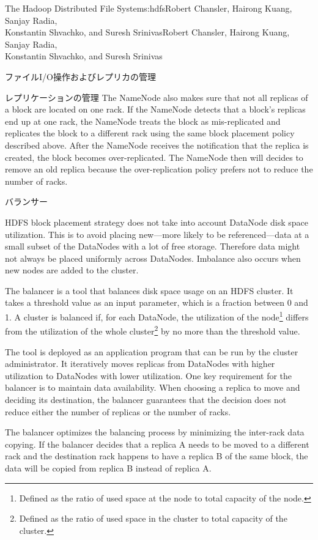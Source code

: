 \begin{aosachaptertoc}{The Hadoop Distributed File System}{s:hdfs}{Robert Chansler, Hairong Kuang, Sanjay Radia, \\ Konstantin Shvachko, and Suresh Srinivas}{Robert Chansler, Hairong Kuang, Sanjay Radia, \\ \hspace*{0.9cm} Konstantin Shvachko, and Suresh Srinivas}
\begin{aosasect1}{ファイルI/O操作およびレプリカの管理}
\begin{aosasect2}{レプリケーションの管理}
The NameNode also makes sure that not all replicas of a block are
located on one rack. If the NameNode detects that a block's replicas
end up at one rack, the NameNode treats the block as mis-replicated
and replicates the block to a different rack using the same block
placement policy described above. After the NameNode receives the
notification that the replica is created, the block becomes
over-replicated. The NameNode then will decides to remove an old
replica because the over-replication policy prefers not to reduce the
number of racks.

\end{aosasect2}

\begin{aosasect2}{バランサー}

HDFS block placement strategy does not take into account DataNode disk
space utilization. This is to avoid placing new---more likely to be
referenced---data at a small subset of the DataNodes with a lot of
free storage. Therefore data might not always be placed uniformly
across DataNodes. Imbalance also occurs when new nodes are added to
the cluster.

The balancer is a tool that balances disk space usage on an HDFS
cluster. It takes a threshold value as an input parameter, which is a
fraction between 0 and 1. A cluster is balanced if, for each DataNode,
the utilization of the node\footnote{Defined as the ratio of used
space at the node to total capacity of the node.} differs from the
utilization of the whole cluster\footnote{Defined as the ratio of used
space in the cluster to total capacity of the cluster.} by no more
than the threshold value.

The tool is deployed as an application program that can be run by the
cluster administrator. It iteratively moves replicas from DataNodes
with higher utilization to DataNodes with lower utilization. One key
requirement for the balancer is to maintain data availability. When
choosing a replica to move and deciding its destination, the balancer
guarantees that the decision does not reduce either the number of
replicas or the number of racks.

The balancer optimizes the balancing process by minimizing the
inter-rack data copying. If the balancer decides that a replica A
needs to be moved to a different rack and the destination rack happens
to have a replica B of the same block, the data will be copied from
replica B instead of replica A.


\end{aosasect2}
\end{aosasect1}
\end{aosachaptertoc}
